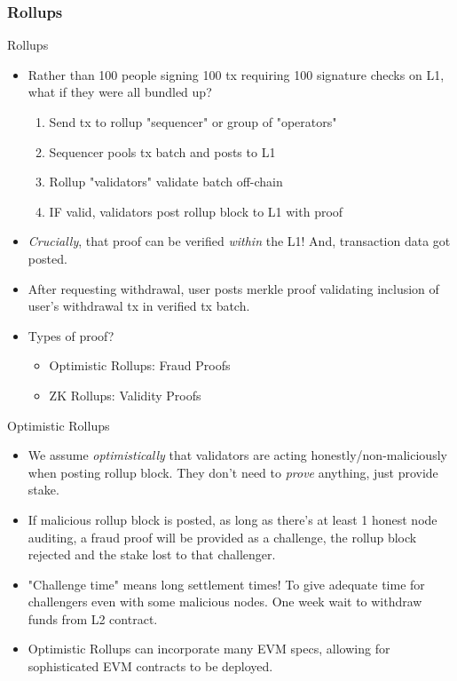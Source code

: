 \documentclass[aspectratio=169,xcolor=dvipsnames]{beamer}
\begin{document}
\subsubsection{Rollups}
\begin{frame}{Rollups}
\begin{itemize}
    \item Rather than 100 people signing 100 tx requiring 100 signature checks on L1, what if they were all bundled up?
    \begin{enumerate}
        \item Send tx to rollup "sequencer" or group of "operators"
        \item Sequencer pools tx batch and posts to L1
        \item Rollup "validators" validate batch off-chain
        \item IF valid, validators post rollup block to L1 with proof
    \end{enumerate}
    \item \textit{Crucially}, that proof can be verified \textit{within} the L1! And, transaction data got posted.
    \item After requesting withdrawal, user posts merkle proof validating inclusion of user's withdrawal tx in verified tx batch.
    \item Types of proof?
    \begin{itemize}
        \item Optimistic Rollups: Fraud Proofs
        \item ZK Rollups: Validity Proofs
    \end{itemize}
\end{itemize}
\end{frame}
\begin{frame}{Optimistic Rollups}
    \begin{itemize}
        \item We assume \textit{optimistically} that validators are acting honestly/non-maliciously when posting rollup block. They don't need to \textit{prove} anything, just provide stake.
        \item If malicious rollup block is posted, as long as there's at least 1 honest node auditing, a fraud proof will be provided as a challenge, the rollup block rejected and the stake lost to that challenger. 
        \item "Challenge time" means long settlement times! To give adequate time for challengers even with some malicious nodes. One week wait to withdraw funds from L2 contract.
        \item Optimistic Rollups can incorporate many EVM specs, allowing for sophisticated EVM contracts to be deployed.
    \end{itemize}
\end{frame}
\end{document}

